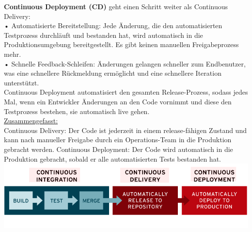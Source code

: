 \documentclass{article}
\begin{document}
\begin{enumerate}[label=\alph*)]
\textbf{Continuous Deployment (CD)} geht einen Schritt weiter als Continuous Delivery:\\
• Automatisierte Bereitstellung: Jede Änderung, die den automatisierten Testprozess durchläuft und bestanden hat, wird automatisch in die Produktionsumgebung bereitgestellt. Es gibt keinen manuellen Freigabeprozess mehr.\\
• Schnelle Feedback-Schleifen: Änderungen gelangen schneller zum Endbenutzer, was eine schnellere Rückmeldung ermöglicht und eine schnellere Iteration unterstützt.\\
Continuous Deployment automatisiert den gesamten Release-Prozess, sodass jedes Mal, wenn ein Entwickler Änderungen an den Code vornimmt und diese den Testprozess bestehen, sie automatisch live gehen.\\

\underline{Zusammengefasst:}\\
Continuous Delivery: Der Code ist jederzeit in einem release-fähigen Zustand und kann nach manueller Freigabe durch ein Operations-Team in die Produktion gebracht werden.
Continuous Deployment: Der Code wird automatisch in die Produktion gebracht, sobald er alle automatisierten Tests bestanden hat.\\
   
   \includegraphics[scale=0.6]{media/CICD.png}  
   
\newpage


\end{enumerate}
\end{document}
